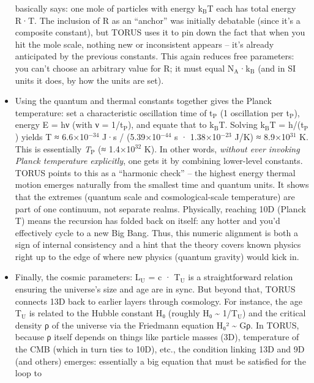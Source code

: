 \documentclass[]{article}
\newcommand{\subscript}[1]{\ensuremath{_{\mathrm{#1}}}}
\newcommand{\superscript}[1]{\ensuremath{^{\mathrm{#1}}}}
\begin{document}
\begin{itemize}
  basically says: one mole of particles with energy
  k\subscript{B}T each has
  total energy R·T. The inclusion of R as an ``anchor'' was initially
  debatable (since it's a composite constant), but TORUS uses it to pin
  down the fact that when you hit the mole scale, nothing new or
  inconsistent appears -- it's already anticipated by the previous
  constants​. This again reduces free parameters: you can't choose an
  arbitrary value for R; it must equal
  N\subscript{A}·k\subscript{B}
  (and in SI units it does, by how the units are set).
\item
  Using the quantum and thermal constants together gives the Planck
  temperature: set a characteristic oscillation time of
  t\subscript{P} (1
  oscillation per
  t\subscript{P}), energy E
  = hν (with ν =
  1/t\subscript{P}), and
  equate that to
  k\subscript{B}T. Solving
  k\subscript{B}T =
  h/(t\subscript{P}) yields
  T ≈ 6.6×10\superscript{−34} J·s / (5.39×10\superscript{−44} s · 1.38×10\superscript{−23} J/K) ≈
  8.9×10\superscript{31} K​. This is essentially
  \emph{T\subscript{P}} (≈
  1.4×10\superscript{32} K)​. In other words, \emph{without ever invoking Planck
  temperature explicitly}, one gets it by combining lower-level
  constants. TORUS points to this as a ``harmonic check'' -- the highest
  energy thermal motion emerges naturally from the smallest time and
  quantum units​. It shows that the extremes (quantum scale and
  cosmological-scale temperature) are part of one continuum, not
  separate realms. Physically, reaching 10D (Planck T) means the
  recursion has folded back on itself: any hotter and you'd effectively
  cycle to a new Big Bang. Thus, this numeric alignment is both a sign
  of internal consistency and a hint that the theory covers known
  physics right up to the edge of where new physics (quantum gravity)
  would kick in.
\item
  Finally, the cosmic parameters:
  L\subscript{U} = c ·
  T\subscript{U} is a
  straightforward relation ensuring the universe's size and age are in
  sync​. But beyond that, TORUS connects 13D back to earlier layers
  through cosmology. For instance, the age
  T\subscript{U} is related
  to the Hubble constant H₀ (roughly H₀ \textasciitilde{}
  1/T\subscript{U}) and the
  critical density ρ of the universe via the Friedmann equation H₀²
  \textasciitilde{} Gρ​. In TORUS, because ρ itself depends on things
  like particle masses (3D), temperature of the CMB (which in turn ties
  to 10D), etc., the condition linking 13D and 9D (and others) emerges:
  essentially a big equation that must be satisfied for the loop to

\end{itemize}
\end{document}
